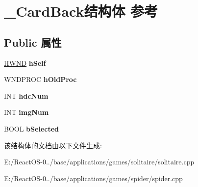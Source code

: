 \hypertarget{struct___card_back}{}\section{\+\_\+\+Card\+Back结构体 参考}
\label{struct___card_back}
\subsection*{Public 属性}
\begin{DoxyCompactItemize}
\item 
\mbox{\label{struct___card_back_a099215d02fae6c315d3ab9ba434848de}} 
\hyperlink{interfacevoid}{H\+W\+ND} {\bfseries h\+Self}
\item 
\mbox{\label{struct___card_back_a92b854bbab6b83c7e42d31fa91a8ac03}} 
W\+N\+D\+P\+R\+OC {\bfseries h\+Old\+Proc}
\item 
\mbox{\label{struct___card_back_afc76753b1e61cf02973d6dc458c6bc5f}} 
I\+NT {\bfseries hdc\+Num}
\item 
\mbox{\label{struct___card_back_a8091a918059ca4a1e9042cd6417a11dc}} 
I\+NT {\bfseries img\+Num}
\item 
\mbox{\label{struct___card_back_a67f563cf50da2ddd3259e54dbfa2a815}} 
B\+O\+OL {\bfseries b\+Selected}
\end{DoxyCompactItemize}


该结构体的文档由以下文件生成\+:\begin{DoxyCompactItemize}
\item 
E\+:/\+React\+O\+S-\/0../base/applications/games/solitaire/solitaire.\+cpp\item 
E\+:/\+React\+O\+S-\/0../base/applications/games/spider/spider.\+cpp\end{DoxyCompactItemize}
